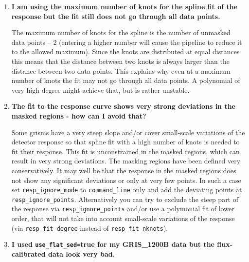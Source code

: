 \begin{enumerate}
The FORS pipeline has a special way to handle the parameters which are in the grism tables. Basically, the initial values are always taken from the grism table. Still, during the loop execution, the parameters can be changed to the desired values. If you want to use different values as initial values for those parameters, edit the grism tables (FORS2\_GRS\_*) to create your own version. The parameters affected are: {\tt dispersion, peakdetection, wdegree,
cdegree, reference, startwavelength, endwavelength, resp\_use\_flat\_sed,
resp\_fit\_degree, resp\_fit\_nknots,} and {\tt dradius\_aver}.

\item {\bf I am using the maximum number of knots for the spline fit of the response but the fit still does not go through all data points.}

The maximum number of knots for the spline is the number of unmasked data points – 2 (entering a higher number will cause the pipeline to reduce it to the allowed maximum). Since the knots are distributed at equal distances this means that the distance between two knots is always larger than the distance between
two data points. This explains why even at a maximum number of knots the fit may not go through all data points. A polynomial of very high degree might achieve that, but is rather unstable.

\item {\bf The fit to the response curve shows very strong deviations in the masked regions - how can I avoid that?}

Some grisms have a very steep slope and/or cover small-scale variations of the detector response so that spline fit with a high number of knots is needed to fit their response. This fit is unconstrained in the masked regions, which can result in very strong deviations. The masking regions have been defined very
conservatively. It may well be that the response in the masked regions does not show any significant deviations or only at very few points. In such a case set {\tt resp\_ignore\_mode} to {\tt command\_line} only and add the deviating points at {\tt resp\_ignore\_points}. Alternatively you can try to exclude the
steep part of the response via {\tt resp\_ignore\_points} and/or use a polymonial fit of lower order, that will not take into account small-scale variations of the response (via {\tt resp\_fit\_degree} instead of {\tt resp\_fit\_nknots}).

\item {\bf I used {\tt use\_flat\_sed=}true for my GRIS\_1200B data but the flux-calibrated data look very bad.}


\end{enumerate}
